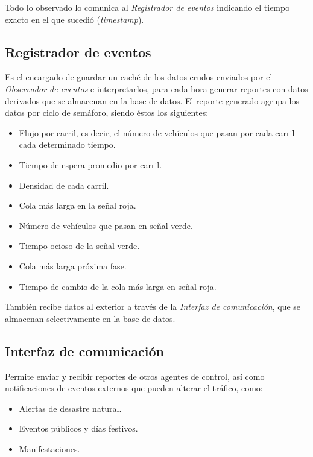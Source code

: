 Todo lo observado lo comunica al \emph{Registrador de eventos} indicando
el tiempo exacto en el que sucedió (\emph{timestamp}).

\hypertarget{registrador-de-eventos}{%
\subsection{Registrador de eventos}\label{registrador-de-eventos}}

Es el encargado de guardar un caché de los datos crudos enviados por el
\emph{Observador de eventos} e interpretarlos, para cada hora generar
reportes con datos derivados que se almacenan en la base de datos. El
reporte generado agrupa los datos por ciclo de semáforo, siendo éstos
los siguientes:

\begin{itemize}
\item
  Flujo por carril, es decir, el número de vehículos que pasan por cada
  carril cada determinado tiempo.
\item
  Tiempo de espera promedio por carril.
\item
  Densidad de cada carril.
\item
  Cola más larga en la señal roja.
\item
  Número de vehículos que pasan en señal verde.
\item
  Tiempo ocioso de la señal verde.
\item
  Cola más larga próxima fase.
\item
  Tiempo de cambio de la cola más larga en señal roja.
\end{itemize}

También recibe datos al exterior a través de la \emph{Interfaz de
comunicación}, que se almacenan selectivamente en la base de datos.

\hypertarget{interfaz-de-comunicaciuxf3n}{%
\subsection{Interfaz de
comunicación}\label{interfaz-de-comunicaciuxf3n}}

Permite enviar y recibir reportes de otros agentes de control, así como
notificaciones de eventos externos que pueden alterar el tráfico, como:

\begin{itemize}
\item
  Alertas de desastre natural.
\item
  Eventos públicos y días festivos.
\item
  Manifestaciones.
\end{itemize}

